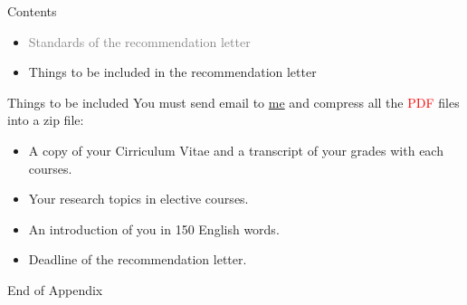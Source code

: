 \documentclass{beamer}
\begin{document}
\begin{frame}{Contents}
\begin{itemize}
\item \textcolor{gray}{Standards of the recommendation letter}
\item Things to be included in the recommendation letter
\end{itemize}
\end{frame}
\begin{frame}{Things to be included}
You must send email to \href{mailto:politics-tchsiao@gmail.com}{me} and compress all the \textcolor{red}{PDF} files into a zip file:
\begin{itemize}
\item A copy of your Cirriculum Vitae and a transcript of your grades with each courses.
\item Your research topics in elective courses.
\item An introduction of you in 150 English words.
\item Deadline of the recommendation letter.
\end{itemize}
\end{frame}
\begin{frame}{}
\begin{center}
\Large{End of Appendix}
\end{center}
\end{frame}
\end{document}
